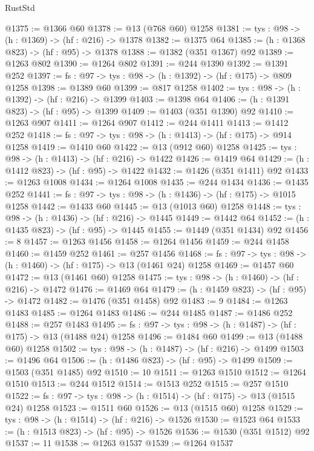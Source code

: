 \begin{lexlean}{RustStd}
\begin{coremodule}
@1375 := @1366 @60
@1378 := @13 (@768 @60) @1258
@1381 := {tys : @98} -> (h : @1369) -> (hf : @216) -> @1378
@1382 := @1375 @64
@1385 := (h : @1368 @823) -> (hf : @95) -> @1378
@1388 := @1382 (@351 @1367) @92
@1389 := @1263 @802
@1390 := @1264 @802
@1391 := @244 @1390
@1392 := @1391 @252
@1397 := {fs : @97} -> {tys : @98} -> (h : @1392) -> (hf : @175) -> @809 @1258
@1398 := @1389 @60
@1399 := @817 @1258
@1402 := {tys : @98} -> (h : @1392) -> (hf : @216) -> @1399
@1403 := @1398 @64
@1406 := (h : @1391 @823) -> (hf : @95) -> @1399
@1409 := @1403 (@351 @1390) @92
@1410 := @1263 @907
@1411 := @1264 @907
@1412 := @244 @1411
@1413 := @1412 @252
@1418 := {fs : @97} -> {tys : @98} -> (h : @1413) -> (hf : @175) -> @914 @1258
@1419 := @1410 @60
@1422 := @13 (@912 @60) @1258
@1425 := {tys : @98} -> (h : @1413) -> (hf : @216) -> @1422
@1426 := @1419 @64
@1429 := (h : @1412 @823) -> (hf : @95) -> @1422
@1432 := @1426 (@351 @1411) @92
@1433 := @1263 @1008
@1434 := @1264 @1008
@1435 := @244 @1434
@1436 := @1435 @252
@1441 := {fs : @97} -> {tys : @98} -> (h : @1436) -> (hf : @175) -> @1015 @1258
@1442 := @1433 @60
@1445 := @13 (@1013 @60) @1258
@1448 := {tys : @98} -> (h : @1436) -> (hf : @216) -> @1445
@1449 := @1442 @64
@1452 := (h : @1435 @823) -> (hf : @95) -> @1445
@1455 := @1449 (@351 @1434) @92
@1456 := 8
@1457 := @1263 @1456
@1458 := @1264 @1456
@1459 := @244 @1458
@1460 := @1459 @252
@1461 := @257 @1456
@1468 := {fs : @97} -> {tys : @98} -> (h : @1460) -> (hf : @175) -> @13 (@1461 @24) @1258
@1469 := @1457 @60
@1472 := @13 (@1461 @60) @1258
@1475 := {tys : @98} -> (h : @1460) -> (hf : @216) -> @1472
@1476 := @1469 @64
@1479 := (h : @1459 @823) -> (hf : @95) -> @1472
@1482 := @1476 (@351 @1458) @92
@1483 := 9
@1484 := @1263 @1483
@1485 := @1264 @1483
@1486 := @244 @1485
@1487 := @1486 @252
@1488 := @257 @1483
@1495 := {fs : @97} -> {tys : @98} -> (h : @1487) -> (hf : @175) -> @13 (@1488 @24) @1258
@1496 := @1484 @60
@1499 := @13 (@1488 @60) @1258
@1502 := {tys : @98} -> (h : @1487) -> (hf : @216) -> @1499
@1503 := @1496 @64
@1506 := (h : @1486 @823) -> (hf : @95) -> @1499
@1509 := @1503 (@351 @1485) @92
@1510 := 10
@1511 := @1263 @1510
@1512 := @1264 @1510
@1513 := @244 @1512
@1514 := @1513 @252
@1515 := @257 @1510
@1522 := {fs : @97} -> {tys : @98} -> (h : @1514) -> (hf : @175) -> @13 (@1515 @24) @1258
@1523 := @1511 @60
@1526 := @13 (@1515 @60) @1258
@1529 := {tys : @98} -> (h : @1514) -> (hf : @216) -> @1526
@1530 := @1523 @64
@1533 := (h : @1513 @823) -> (hf : @95) -> @1526
@1536 := @1530 (@351 @1512) @92
@1537 := 11
@1538 := @1263 @1537
@1539 := @1264 @1537

\end{coremodule}
\end{lexlean}
